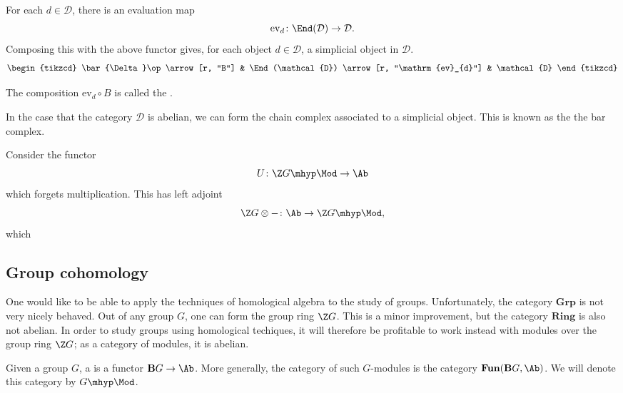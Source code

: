 \documentclass[main.tex]{subfiles}
\begin{document}
For each $d \in \mathcal{D}$, there is an evaluation map
\begin{equation*}
  \mathrm{ev}_{d}\colon \End(\mathcal{D}) \to \mathcal{D}.
\end{equation*}
Composing this with the above functor gives, for each object $d \in \mathcal{D}$, a simplicial object in $\mathcal{D}$.
\begin{equation*}
  \begin{tikzcd}
    \bar{\Delta}\op
    \arrow[r, "B"]
    & \End(\mathcal{D})
    \arrow[r, "\mathrm{ev}_{d}"]
    & \mathcal{D}
  \end{tikzcd}
\end{equation*}

\begin{definition}
  \label{def:bar_construction}
  The composition $\mathrm{ev}_{d} \circ B$ is called the .
\end{definition}

In the case that the category $\mathcal{D}$ is abelian, we can form the chain complex associated to a simplicial object. This is known as the the bar complex.

\begin{example}
  Consider the functor
  \begin{equation*}
    U\colon \Z G\mhyp\Mod \to \Ab
  \end{equation*}
  which forgets multiplication. This has left adjoint
  \begin{equation*}
    \Z G \otimes -\colon \Ab \to \Z G\mhyp\Mod,
  \end{equation*}
  which
\end{example}

\subsection{Group cohomology}
\label{ssc:group_cohomology}

One would like to be able to apply the techniques of homological algebra to the study of groups. Unfortunately, the category $\mathbf{Grp}$ is not very nicely behaved. Out of any group $G$, one can form the group ring $\Z G$. This is a minor improvement, but the category $\mathbf{Ring}$ is also not abelian. In order to study groups using homological techiques, it will therefore be profitable to work instead with modules over the group ring $\Z G$; as a category of modules, it is abelian.

Given a group $G$, a  is a functor $\mathbf{B}G \to \Ab$. More generally, the category of such $G$-modules is the category $\mathbf{Fun}(\mathbf{B}G, \Ab)$. We will denote this category by $G\mhyp\Mod$.
\end{document}
